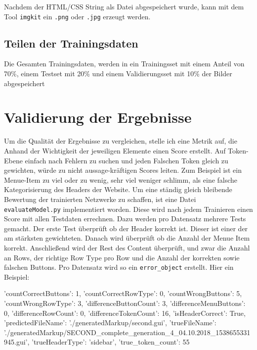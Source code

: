 \documentclass[pdftex,a4paper,halfparskip]{scrartcl}
\begin{document}
Nachdem der HTML/CSS String als Datei abgespeichert wurde, kann mit dem Tool \texttt{imgkit} ein \texttt{.png} oder \texttt{.jpg} erzeugt werden.

\subsection{Teilen der Trainingsdaten}

Die Gesamten Trainingsdaten, werden in ein Trainingsset mit einem Anteil von 70\%, einem Testset mit 20\% und einem Validierungsset mit 10\% der Bilder abgespeichert

\section{Validierung der Ergebnisse}
Um die Qualität der Ergebnisse zu vergleichen, stelle ich eine Metrik auf, die Anhand der Wichtigkeit der jeweiligen Elemente einen Score erstellt. Auf Token-Ebene einfach nach Fehlern zu suchen und jeden Falschen Token gleich zu gewichten, würde zu nicht aussage-kräftigen Scores leiten. Zum Beispiel ist ein Menue-Item zu viel oder zu wenig, sehr viel weniger schlimm, als eine falsche Kategorisierung des Headers der Website. Um eine ständig gleich bleibende Bewertung der trainierten Netzwerke zu schaffen, ist eine Datei \texttt{evaluateModel.py} implementiert worden. Diese wird nach jedem Trainieren einen Score mit allen Testdaten errechnen. Dazu werden pro Datensatz mehrere Tests gemacht. Der erste Test überprüft ob der Header korrekt ist. Dieser ist einer der am stärksten gewichteten. Danach wird überprüft ob die Anzahl der Menue Item korrekt. Anschließend wird der Rest des Content überprüft, und zwar die Anzahl an Rows, der richtige Row Type pro Row und die Anzahl der korrekten sowie falschen Buttons. Pro Datensatz wird so ein \texttt{error\_object} erstellt. 
Hier ein Beispiel:

\begin{spverbatim}

{
 'countCorrectButtons': 1,
 'countCorrectRowType': 0,
 'countWrongButtons': 5,
 'countWrongRowType': 3,
 'differenceButtonCount': 3,
 'differenceMenuButtons': 0,
 'differenceRowCount': 0,
 'differenceTokenCount': 16,
 'isHeaderCorrect': True,
 'predictedFileName': './generatedMarkup/second.gui',
 'trueFileName': './generatedMarkup/SECOND_complete_generation_4_04.10.2018_1538655331945.gui',
 'trueHeaderType': 'sidebar',
 'true_token_count': 55
}

\end{spverbatim}
\end{document}
